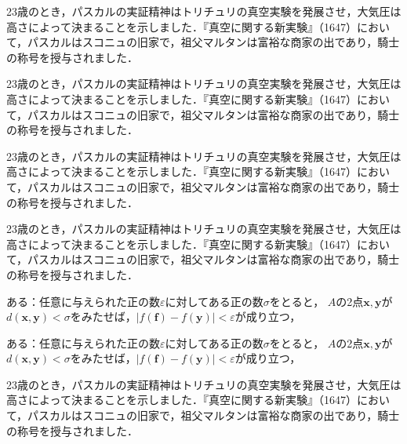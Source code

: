 \begin{命題}
23歳のとき，パスカルの実証精神はトリチュリの真空実験を発展させ，大気圧は高さによって決まることを示しました．『真空に関する新実験』（1647）において，パスカルはスコニュの旧家で，祖父マルタンは富裕な商家の出であり，騎士の称号を授与されました．\end{命題}
\begin{命題}
23歳のとき，パスカルの実証精神はトリチュリの真空実験を発展させ，大気圧は高さによって決まることを示しました．『真空に関する新実験』（1647）において，パスカルはスコニュの旧家で，祖父マルタンは富裕な商家の出であり，騎士の称号を授与されました．\end{命題}

\begin{注意}
23歳のとき，パスカルの実証精神はトリチュリの真空実験を発展させ，大気圧は高さによって決まることを示しました．『真空に関する新実験』（1647）において，パスカルはスコニュの旧家で，祖父マルタンは富裕な商家の出であり，騎士の称号を授与されました．\end{注意}
\begin{注意}
23歳のとき，パスカルの実証精神はトリチュリの真空実験を発展させ，大気圧は高さによって決まることを示しました．『真空に関する新実験』（1647）において，パスカルはスコニュの旧家で，祖父マルタンは富裕な商家の出であり，騎士の称号を授与されました．\end{注意}
\begin{例}[ポアッソン分布のパラメータ]
ある：任意に与えられた正の数$\varepsilon$に対してある正の数$\sigma$をとると，
$A$の2点$\bm{x},\bm{y}$が$d(\bm{x},\bm{y})<\sigma$をみたせば，$|f(\bm{f})-f(\bm{y})|<\varepsilon$が成り立つ，
\end{例}
\begin{例}[ポアッソン分布のパラメータ]
ある：任意に与えられた正の数$\varepsilon$に対してある正の数$\sigma$をとると，
$A$の2点$\bm{x},\bm{y}$が$d(\bm{x},\bm{y})<\sigma$をみたせば，$|f(\bm{f})-f(\bm{y})|<\varepsilon$が成り立つ，
\end{例}
23歳のとき，パスカルの実証精神はトリチュリの真空実験を発展させ，大気圧は高さによって決まることを示しました．『真空に関する新実験』（1647）において，パスカルはスコニュの旧家で，祖父マルタンは富裕な商家の出であり，騎士の称号を授与されました．
